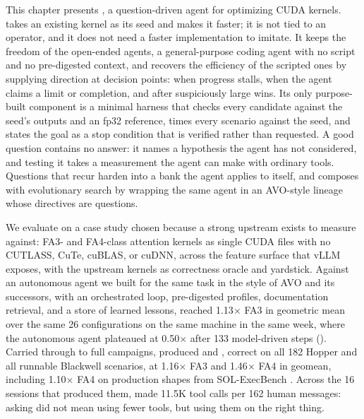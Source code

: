 This chapter presents \KernelSeek, a question-driven agent for optimizing CUDA kernels. \KernelSeek takes an
existing kernel as its seed and makes it faster; it is not tied to an operator, and it does not need
a faster implementation to imitate. It keeps the freedom of the open-ended agents, a general-purpose
coding agent with no script and no pre-digested context, and recovers the efficiency of the scripted
ones by supplying direction at decision points: when progress stalls, when the agent claims a limit
or completion, and after suspiciously large wins. Its only purpose-built component is a minimal
harness that checks every candidate against the seed's outputs and an fp32 reference, times every
scenario against the seed, and states the goal as a stop condition that is verified rather than
requested. A good question contains no answer: it names a hypothesis the agent has not considered,
and testing it takes a measurement the agent can make with ordinary tools. Questions that recur
harden into a bank the agent applies to itself, and \KernelSeek composes with evolutionary search by
wrapping the same agent in an AVO-style lineage whose directives are questions.

We evaluate \KernelSeek on a case study chosen because a strong upstream exists to measure against:
FA3- and FA4-class attention kernels as single CUDA files with no CUTLASS, CuTe, cuBLAS, or cuDNN,
across the feature surface that vLLM exposes, with the upstream kernels as correctness oracle and
yardstick. Against an autonomous agent we built for the same task in the style of AVO and its
successors, with an orchestrated loop, pre-digested profiles, documentation retrieval, and a store
of learned lessons, \KernelSeek reached 1.13$\times$ FA3 in geometric mean over the same 26 configurations
on the same machine in the same week, where the autonomous agent plateaued at 0.50$\times$ after 133
model-driven steps (). Carried through to full campaigns, \KernelSeek produced
\ksFaThree and \ksFaFour, correct on all 182 Hopper and all runnable Blackwell scenarios, at
1.16$\times$ FA3 and 1.46$\times$ FA4 in geomean, including 1.10$\times$ FA4 on production shapes
from SOL-ExecBench \cite{solexecbench}. Across the 16 sessions that produced them, \KernelSeek
made 11.5K tool calls per 162 human messages: asking did not mean using fewer tools, but using them
on the right thing.

